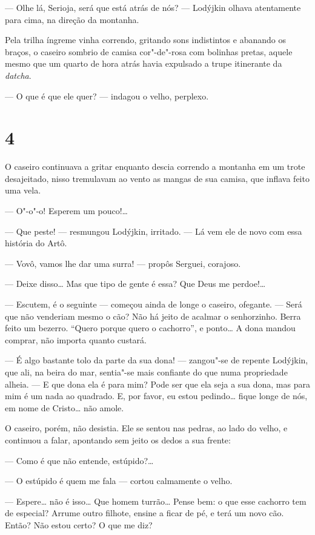 --- Olhe lá, Serioja, será que está atrás de nós? --- Lodýjkin olhava
atentamente para cima, na direção da montanha.

Pela trilha íngreme vinha correndo, gritando sons indistintos e abanando
os braços, o caseiro sombrio de camisa cor"-de"-rosa com bolinhas pretas,
aquele mesmo que um quarto de hora atrás havia expulsado a trupe
itinerante da \emph{datcha}.

--- O que é que ele quer? --- indagou o velho, perplexo.

\section{4}

O caseiro continuava a gritar enquanto descia correndo a montanha em um
trote desajeitado, nisso tremulavam ao vento as mangas de sua camisa,
que inflava feito uma vela.

--- O"-o"-o! Esperem um pouco!\ldots{}

--- Que peste! --- resmungou Lodýjkin, irritado. --- Lá vem ele de novo
com essa história do Artô.

--- Vovô, vamos lhe dar uma surra! --- propôs Serguei, corajoso.

--- Deixe disso\ldots{} Mas que tipo de gente é essa? Que Deus me perdoe!\ldots{}

--- Escutem, é o seguinte --- começou ainda de longe o caseiro,
ofegante. --- Será que não venderiam mesmo o cão? Não há jeito de
acalmar o senhorzinho. Berra feito um bezerro. ``Quero porque quero o
cachorro'', e ponto\ldots{} A dona mandou comprar, não importa quanto
custará.

--- É algo bastante tolo da parte da sua dona! --- zangou"-se de repente
Lodýjkin, que ali, na beira do mar, sentia"-se mais confiante do que numa
propriedade alheia. --- E que dona ela é para mim? Pode ser que ela seja
a sua dona, mas para mim é um nada ao quadrado. E, por favor, eu estou
pedindo\ldots{} fique longe de nós, em nome de Cristo\ldots{} não amole.

O caseiro, porém, não desistia. Ele se sentou nas pedras, ao lado do
velho, e continuou a falar, apontando sem jeito os dedos a sua frente:

--- Como é que não entende, estúpido?\ldots{}

--- O estúpido é quem me fala --- cortou calmamente o velho.

--- Espere\ldots{} não é isso\ldots{} Que homem turrão\ldots{} Pense bem: o que esse
cachorro tem de especial? Arrume outro filhote, ensine a ficar de pé, e
terá um novo cão. Então? Não estou certo? O que me diz?

